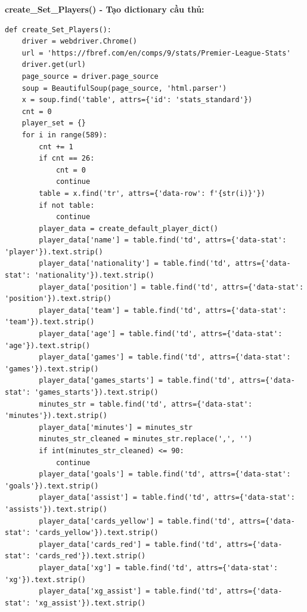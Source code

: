\documentclass[12pt]{report}
\begin{document}
{\textbf*{create\_Set\_Players() - Tạo dictionary cầu thủ:}
\begin{lstlisting}
def create_Set_Players():
    driver = webdriver.Chrome()
    url = 'https://fbref.com/en/comps/9/stats/Premier-League-Stats'
    driver.get(url)
    page_source = driver.page_source
    soup = BeautifulSoup(page_source, 'html.parser')
    x = soup.find('table', attrs={'id': 'stats_standard'})
    cnt = 0
    player_set = {}
    for i in range(589):
        cnt += 1
        if cnt == 26:
            cnt = 0
            continue
        table = x.find('tr', attrs={'data-row': f'{str(i)}'})
        if not table:
            continue
        player_data = create_default_player_dict()
        player_data['name'] = table.find('td', attrs={'data-stat': 'player'}).text.strip()
        player_data['nationality'] = table.find('td', attrs={'data-stat': 'nationality'}).text.strip()
        player_data['position'] = table.find('td', attrs={'data-stat': 'position'}).text.strip()
        player_data['team'] = table.find('td', attrs={'data-stat': 'team'}).text.strip()
        player_data['age'] = table.find('td', attrs={'data-stat': 'age'}).text.strip()
        player_data['games'] = table.find('td', attrs={'data-stat': 'games'}).text.strip()
        player_data['games_starts'] = table.find('td', attrs={'data-stat': 'games_starts'}).text.strip()
        minutes_str = table.find('td', attrs={'data-stat': 'minutes'}).text.strip()
        player_data['minutes'] = minutes_str
        minutes_str_cleaned = minutes_str.replace(',', '')
        if int(minutes_str_cleaned) <= 90:
            continue
        player_data['goals'] = table.find('td', attrs={'data-stat': 'goals'}).text.strip()
        player_data['assist'] = table.find('td', attrs={'data-stat': 'assists'}).text.strip()
        player_data['cards_yellow'] = table.find('td', attrs={'data-stat': 'cards_yellow'}).text.strip()
        player_data['cards_red'] = table.find('td', attrs={'data-stat': 'cards_red'}).text.strip()
        player_data['xg'] = table.find('td', attrs={'data-stat': 'xg'}).text.strip()
        player_data['xg_assist'] = table.find('td', attrs={'data-stat': 'xg_assist'}).text.strip()

\end{lstlisting}}
\end{document}
